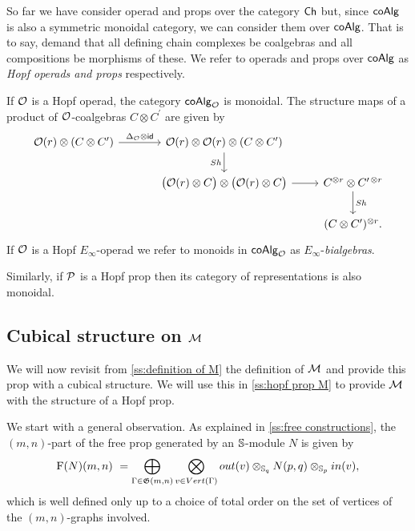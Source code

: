 So far we have consider operad and props over the category $\Ch$ but, since $\coAlg$ is also a symmetric monoidal category, we can consider them over $\coAlg$.
That is to say, demand that all defining chain complexes be coalgebras and all compositions be morphisms of these.
We refer to operads and props over $\coAlg$ as \textit{Hopf operads and props} respectively.

If $\cO$ is a Hopf operad, the category $\coAlg_\cO$ is monoidal.
The structure maps of a product of $\cO$-coalgebras $C \otimes C^\prime$ are given by
\[
\begin{tikzcd} [column sep = normal, row sep=normal]
	\cO(r) \otimes (C \otimes C^\prime) \arrow[r, "\Delta_\cO \otimes \id"] &[10 pt] \cO(r) \otimes \cO(r) \otimes (C \otimes C^\prime) \arrow[d, "Sh"'] &[-0pt] \\ &
	\big(\cO(r) \otimes C \big) \otimes \big( \cO(r) \otimes C \big) \arrow[r] &
	C^{\otimes r} \otimes C^{\prime\, \otimes r} \arrow[d, "Sh"] \\
	& & (C \otimes C^\prime)^{\otimes r}.
\end{tikzcd}
\]
If $\cO$ is a Hopf $E_\infty$-operad we refer to monoids in $\coAlg_\cO$ as $E_\infty$-\textit{bialgebras}.

Similarly, if $\cP$ is a Hopf prop then its category of representations is also monoidal.

\subsection{Cubical structure on $\M$}

We will now revisit from \cref{ss:definition of M} the definition of $\M$ and provide this prop with a cubical structure.
We will use this in \cref{ss:hopf prop M} to provide $\M$ with the structure of a Hopf prop.

We start with a general observation.
As explained in \cref{ss:free constructions}, the $(m,n)$-part of the free prop generated by an $\S$-module $N$ is given by
\[
\free(N)(m,n) \ = \bigoplus_{\Gamma \in \graphs(m,n)} \bigotimes_{v \in Vert(\Gamma)} out(v) \otimes_{\S_q} N(p, q) \otimes_{\S_p} in(v),
\]
which is well defined only up to a choice of total order on the set of vertices of the $(m,n)$-graphs involved.


